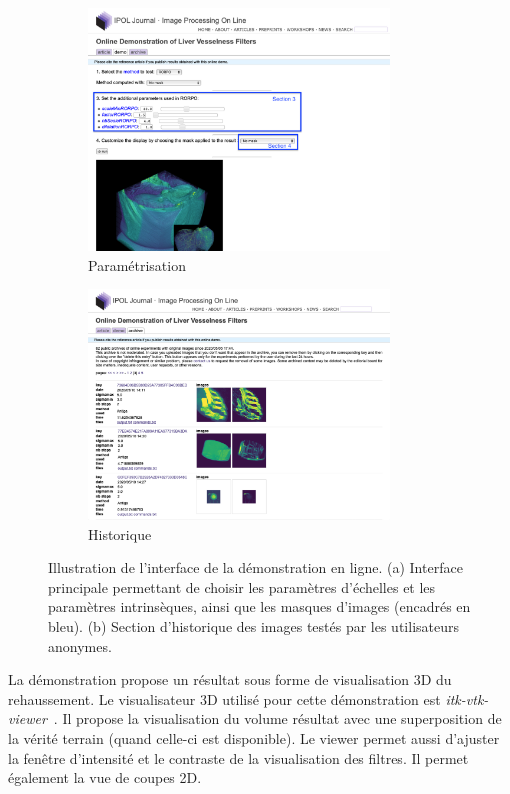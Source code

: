 \begin{figure}[!ht]
    \begin{subfigure}{0.45\textwidth}
        \centering
        \includegraphics[width=8cm]{Images/visuBenchmarkDemos.png}
        \caption{Paramétrisation}
    \end{subfigure}
    \begin{subfigure}{0.45\textwidth}
        \centering
        \includegraphics[width=8cm]{Images/visuBenchmarkDemosArchivesTrim.png}
        \caption{Historique}
    \end{subfigure}

    \caption{Illustration de l'interface de la démonstration en ligne. (a) Interface principale permettant de choisir les paramètres d'échelles et les paramètres intrinsèques, ainsi que les masques d'images (encadrés en bleu). (b) Section d'historique des images testés par les utilisateurs anonymes.}
\label{Fig:DemoExample}
\end{figure}

La démonstration propose un résultat sous forme de visualisation 3D du rehaussement. Le visualisateur 3D utilisé pour cette démonstration est \textit{itk-vtk-viewer}~\cite{Mccormick2020_Visu3DDemo}. Il propose la visualisation du volume résultat avec une superposition de la vérité terrain (quand celle-ci est disponible). Le viewer permet aussi d'ajuster la fenêtre d'intensité et le contraste de la visualisation des filtres. Il permet également la vue de coupes 2D.

